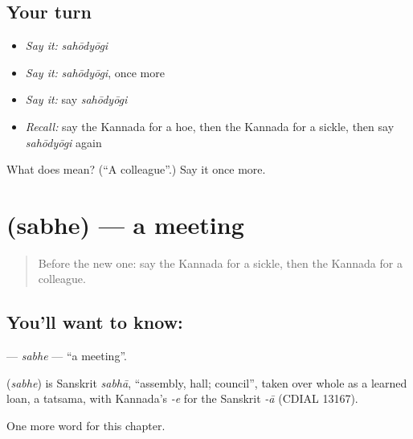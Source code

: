 \subsection*{Your turn}
\begin{itemize}
\raggedright
  \item \emph{Say it:} \emph{sahōdyōgi}
  \item \emph{Say it:} \emph{sahōdyōgi}, once more
  \item \emph{Say it:} say \emph{sahōdyōgi}
  \item \emph{Recall:} say the Kannada for a hoe, then the Kannada for a sickle, then say \emph{sahōdyōgi} again
\end{itemize}

\begin{tcolorbox}[breakable,colback=teal!4,colframe=teal!35!black,title={Before you move on}]
What does  mean? (\textquotedblleft{}A colleague\textquotedblright{}.) Say it once more.
\end{tcolorbox}
\section[\texorpdfstring{\kn{ಸಭೆ} (sabhe)}{ಸಭೆ (sabhe)}]{ (sabhe) — a meeting}

\label{lesson:KA-C231-sabhe}



\begin{quote}
Before the new one: say the Kannada for a sickle, then the Kannada for a colleague.
\end{quote}

\subsection*{You'll want to know: }
\textbf{} — \emph{sabhe} — \textquotedblleft{}a meeting\textquotedblright{}.

\begin{cousinweb}
\textbf{} (\emph{sabhe}) is Sanskrit \emph{sabhā}, \textquotedblleft{}assembly, hall; council\textquotedblright{}, taken over whole as a learned loan, a tatsama, with Kannada's \emph{-e} for the Sanskrit \emph{-ā} (CDIAL 13167).
\end{cousinweb}

\begin{grammarlens}[title={What you've built}]
One more word for this chapter.
\end{grammarlens}

